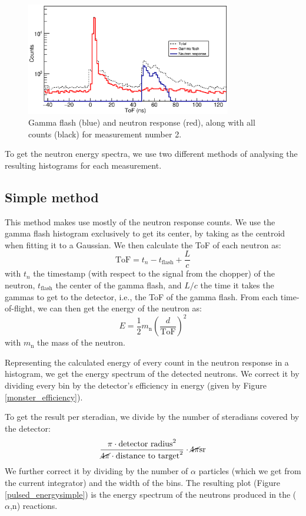 \documentclass[a4paper,12pt]{report}
\newcommand{\an}{($\alpha$,n) }
\begin{document}
\begin{figure}[H]
	\centering
	\includegraphics[width=0.80\textwidth]{separated_tof.eps}
	\caption{Gamma flash (blue) and neutron response (red), along with all counts (black) for measurement number 2.}
	\label{separated_tof}
\end{figure}

To get the neutron energy spectra, we use two different methods of analysing the resulting histograms for each measurement.

\subsection{Simple method}
This method makes use mostly of the neutron response counts.
We use the gamma flash histogram exclusively to get its center, by taking as the centroid when fitting it to a Gaussian.
We then calculate the ToF of each neutron as:
\begin{equation}
	\text{ToF} = t_n-t_\text{flash}+\frac{L}{c}
\end{equation}
with $t_n$ the timestamp (with respect to the signal from the chopper) of the neutron, $t_\text{flash}$ the center of the gamma flash, and $L/c$ the time it takes the gammas to get to the detector, i.e., the ToF of the gamma flash.
From each time-of-flight, we can then get the energy of the neutron as:
\begin{equation}
	E=\frac{1}{2} m_\text{n} \left( \frac{d}{\text{ToF}} \right)^2
\end{equation}
with $m_\text{n}$ the mass of the neutron.

Representing the calculated energy of every count in the neutron response in a histogram, we get the energy spectrum of the detected neutrons.
We correct it by dividing every bin by the detector's efficiency in energy (given by Figure \ref{monster_efficiency}).

To get the result per steradian, we divide by the number of steradians covered by the detector:
\[ \frac{\pi \cdot \text{detector radius}^2}{\cancel{4 \pi} \cdot \text{distance to target}^2}\cdot \cancel{4\pi}\unit{sr}  \]
We further correct it by dividing by the number of $\alpha$ particles (which we get from the current integrator) and the width of the bins.
The resulting plot (Figure \ref{pulsed_energysimple}) is the energy spectrum of the neutrons produced in the \an reactions.
\end{document}
